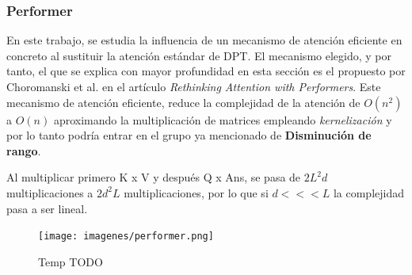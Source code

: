 

\subsubsection{Performer}
En este trabajo, se estudia la influencia de un mecanismo de atención eficiente en concreto al sustituir la atención estándar de DPT. El mecanismo elegido, y por tanto, el que se explica con mayor profundidad en esta sección es el propuesto por Choromanski et al. en el artículo \textit{Rethinking Attention with Performers}. Este mecanismo de atención eficiente, reduce la complejidad de la atención de $O(n^2)$ a $O(n)$ aproximando la multiplicación de matrices empleando \textit{kernelización} y por lo tanto podría entrar en el grupo ya mencionado de \textbf{Disminución de rango}.

Al multiplicar primero K x V y después Q x Ans, se pasa de $2 L^2 d$ multiplicaciones a $2 d^2 L$ multiplicaciones, por lo que si $d <<< L$ la complejidad pasa a ser lineal.


\begin{figure}[H]
\centering
\texttt{[image: imagenes/performer.png]} 
\captionsetup{width=.8\linewidth}
\caption{Temp TODO}
\label{fig:performer}
\end{figure}



